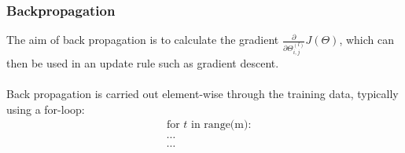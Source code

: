 \documentclass[12pt]{article}
\begin{document}
\subsubsection{Backpropagation}
The aim of back propagation is to calculate the gradient $\frac{\partial}{\partial \Theta^{(l)}_{i,j} }J(\Theta)$, which can then be used in an update rule such as gradient descent.\\
\\
Back propagation is carried out element-wise through the training data, typically using a for-loop:
\begin{equation}
\begin{split}
& \textrm{for $t$ in range(m):}\\
& \cdots\\
& \cdots
\end{split}
\end{equation}
\end{document}
